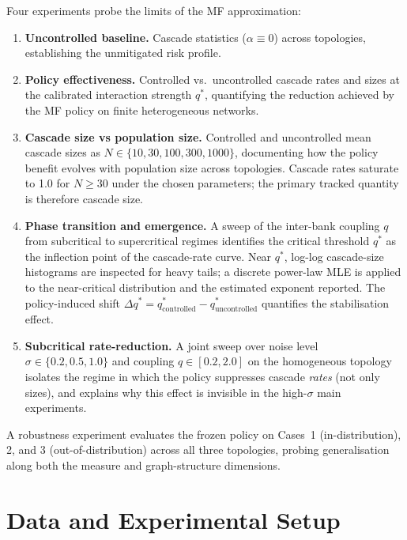 \documentclass[11pt]{article}
\begin{document}
Four experiments probe the limits of the MF approximation:
\begin{enumerate}
  \item \textbf{Uncontrolled baseline.} Cascade statistics ($\alpha \equiv 0$) across topologies, establishing the unmitigated risk profile.
  \item \textbf{Policy effectiveness.} Controlled vs.\ uncontrolled cascade rates and sizes at the calibrated interaction strength $q^*$, quantifying the reduction achieved by the MF policy on finite heterogeneous networks.
  \item \textbf{Cascade size vs population size.} Controlled and uncontrolled mean cascade sizes as $N \in \{10, 30, 100, 300, 1000\}$, documenting how the policy benefit evolves with population size across topologies. Cascade rates saturate to 1.0 for $N \geq 30$ under the chosen parameters; the primary tracked quantity is therefore cascade size.
  \item \textbf{Phase transition and emergence.} A sweep of the inter-bank coupling $q$ from subcritical to supercritical regimes identifies the critical threshold $q^*$ as the inflection point of the cascade-rate curve. Near $q^*$, log-log cascade-size histograms are inspected for heavy tails; a discrete power-law MLE \citep{clauset2009powerlaw} is applied to the near-critical distribution and the estimated exponent reported. The policy-induced shift $\Delta q^* = q^*_{\mathrm{controlled}} - q^*_{\mathrm{uncontrolled}}$ quantifies the stabilisation effect.
  \item \textbf{Subcritical rate-reduction.} A joint sweep over noise level $\sigma \in \{0.2, 0.5, 1.0\}$ and coupling $q \in [0.2, 2.0]$ on the homogeneous topology isolates the regime in which the policy suppresses cascade \emph{rates} (not only sizes), and explains why this effect is invisible in the high-$\sigma$ main experiments.
\end{enumerate}
A robustness experiment evaluates the frozen policy on Cases~1 (in-distribution), 2, and 3 (out-of-distribution) across all three topologies, probing generalisation along both the measure and graph-structure dimensions.


\section{Data and Experimental Setup}
\end{document}
